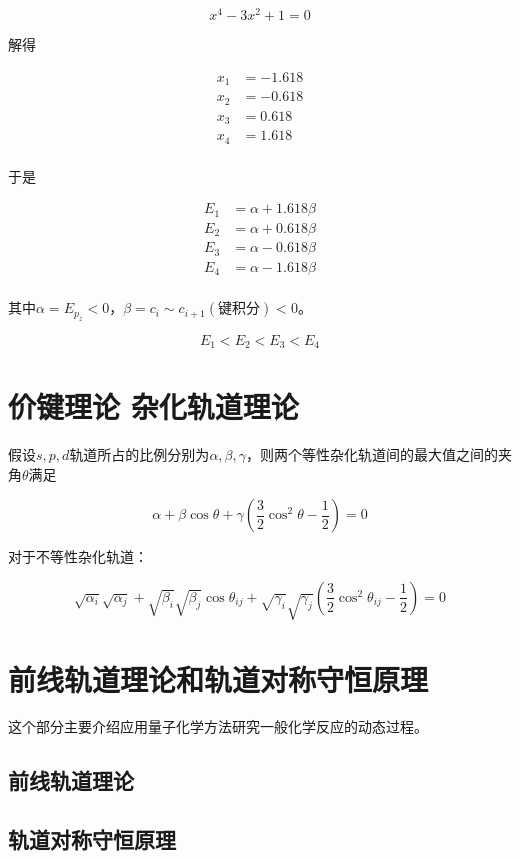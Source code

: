 \begin{equation*}
	x^4 - 3x^2 + 1 = 0
\end{equation*}

解得

\begin{align*}
	x_1 & = -1.618 \\
	x_2 & = -0.618 \\
	x_3 & = 0.618  \\
	x_4 & = 1.618  \\
\end{align*}

于是

\begin{align*}
	E_1 & = \alpha + 1.618\beta \\
	E_2 & = \alpha + 0.618\beta \\
	E_3 & = \alpha - 0.618\beta \\
	E_4 & = \alpha - 1.618\beta \\
\end{align*}

其中$\alpha = E_{p_z} < 0$，$\beta = c_i \sim c_{i+1} (\mbox{键积分}) < 0$。


\begin{equation*}
	E_1 < E_2 < E_3 < E_4
\end{equation*}

\section{价键理论 杂化轨道理论}

假设$s,p,d$轨道所占的比例分别为$\alpha, \beta, \gamma$，则两个等性杂化轨道间的最大值之间的夹角$\theta$满足





\begin{equation*}
	\alpha + \beta \cos \theta + \gamma \left(\frac{3}{2}\cos ^2 \theta - \frac{1}{2}\right) = 0
\end{equation*}

对于不等性杂化轨道：

\begin{equation*}
	\sqrt{\alpha_i} \sqrt{\alpha_j} + \sqrt{\beta_i}{\sqrt{\beta_j}} \cos \theta_{ij} + \sqrt{\gamma_i}\sqrt{\gamma_j} \left( \frac{3}{2} \cos ^2 \theta_{ij} - \frac{1}{2}  \right)= 0
\end{equation*}

\section{前线轨道理论和轨道对称守恒原理}

这个部分主要介绍应用量子化学方法研究一般化学反应的动态过程。

\subsection{前线轨道理论}


\subsection{轨道对称守恒原理}


